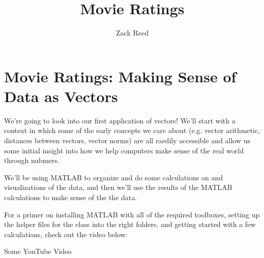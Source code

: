 \documentclass{ximera}
\author{Zack Reed}
\title{Movie Ratings}
\begin{document}
\begin{abstract}

\end{abstract}
\maketitle

\section*{Movie Ratings: Making Sense of Data as Vectors}

  We're going to look into our first application of vectors! We'll start with a context in which some of the early concepts we care about (e.g. vector arithmetic, distances between vectors, vector norms) are all raedily accessible and allow us some initial insight into how we help computers make sense of the real world through nubmers. 

  We'll be using MATLAB to organize and do some calculations on and visualizations of the data, and then we'll use the results of the MATLAB calculations to make sense of the the data. 

  \begin{summary} 

    For a primer on installing MATLAB with all of the required toolboxes, setting up the helper files for the class into the right folders, and getting started with a few calculations, check out the video below:

    \begin{center}
      Some YouTube Video
    \end{center}

  \end{summary}
\end{document}
